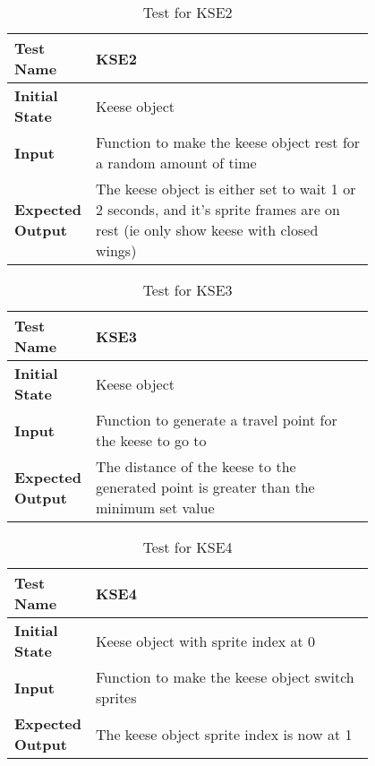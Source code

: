 \documentclass[12pt, titlepage]{article}
\begin{document}
\begin{table}[!htbp]
	
	\begin{tabular}[r]{|l|p{0.8\linewidth}|}
		
		\hline
		
		\textbf{Test Name} & KSE2 \\ 
		\hline
		\textbf{Initial State} & Keese object \\ 
		\hline
		\textbf{Input} & Function to make the keese object rest for a random amount of time \\ 
		\hline 
		\textbf{Expected Output} & The keese object is either set to wait 1 or 2 seconds, and it's sprite frames are on rest (ie only show keese with closed wings)  \\ 
		\hline
		
	\end{tabular}
	\caption{Test for KSE2}
	\label{Table}
\end{table}
\begin{table}[!htbp]
	
	\begin{tabular}[r]{|l|p{0.8\linewidth}|}
		
		\hline
		
		\textbf{Test Name} & KSE3 \\ 
		\hline
		\textbf{Initial State} & Keese object \\ 
		\hline
		\textbf{Input} & Function to generate a travel point for the keese to go to \\ 
		\hline 
		\textbf{Expected Output} & The distance of the keese to the generated point is greater than the minimum set value  \\ 
		\hline
		
	\end{tabular}
	\caption{Test for KSE3}
	\label{Table}
\end{table}
\begin{table}[!htbp]
	
	\begin{tabular}[r]{|l|p{0.8\linewidth}|}
		
		\hline
		
		\textbf{Test Name} & KSE4 \\ 
		\hline
		\textbf{Initial State} & Keese object with sprite index at 0 \\ 
		\hline
		\textbf{Input} & Function to make the keese object switch sprites \\ 
		\hline 
		\textbf{Expected Output} & The keese object sprite index is now at 1  \\ 
		\hline
		
	\end{tabular}
	\caption{Test for KSE4}
	\label{Table}
\end{table}
\end{document}
